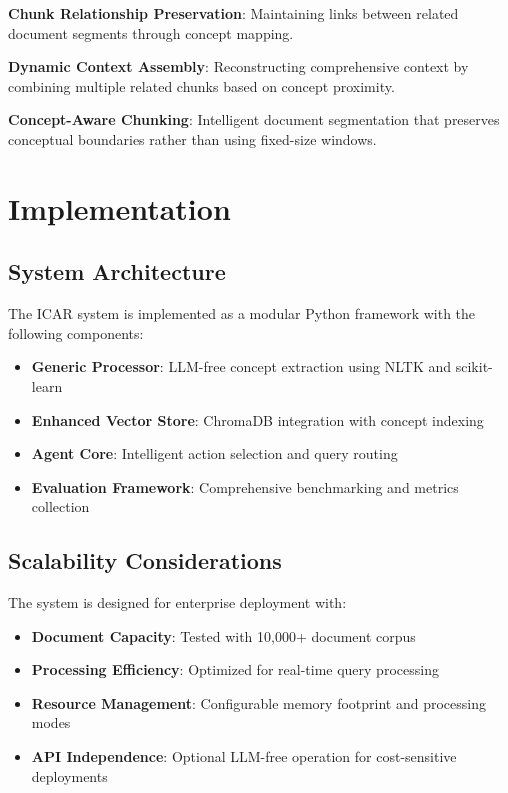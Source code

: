 \documentclass[11pt]{article}
\begin{document}
\textbf{Chunk Relationship Preservation}: Maintaining links between related document segments through concept mapping.

\textbf{Dynamic Context Assembly}: Reconstructing comprehensive context by combining multiple related chunks based on concept proximity.

\textbf{Concept-Aware Chunking}: Intelligent document segmentation that preserves conceptual boundaries rather than using fixed-size windows.

\section{Implementation}

\subsection{System Architecture}

The ICAR system is implemented as a modular Python framework with the following components:

\begin{itemize}
\item \textbf{Generic Processor}: LLM-free concept extraction using NLTK and scikit-learn
\item \textbf{Enhanced Vector Store}: ChromaDB integration with concept indexing
\item \textbf{Agent Core}: Intelligent action selection and query routing
\item \textbf{Evaluation Framework}: Comprehensive benchmarking and metrics collection
\end{itemize}

\subsection{Scalability Considerations}

The system is designed for enterprise deployment with:

\begin{itemize}
\item \textbf{Document Capacity}: Tested with 10,000+ document corpus
\item \textbf{Processing Efficiency}: Optimized for real-time query processing
\item \textbf{Resource Management}: Configurable memory footprint and processing modes
\item \textbf{API Independence}: Optional LLM-free operation for cost-sensitive deployments
\end{itemize}
\end{document}
